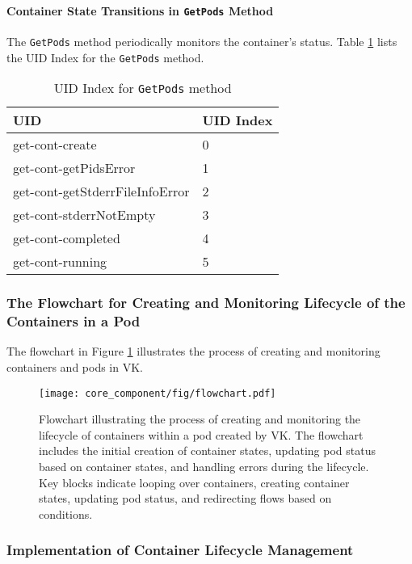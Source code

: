 \paragraph{Container State Transitions in \texttt{GetPods} Method}

The \texttt{GetPods} method periodically monitors the container's status. Table \ref{table:uid_index_getpods} lists the UID Index for the \texttt{GetPods} method.

\begin{table}[h!]
\centering
\caption{UID Index for \texttt{GetPods} method}
\label{table:uid_index_getpods}
\begin{tabular}{|l|l|}
\hline
\textbf{UID} & \textbf{UID Index} \\
\hline
get-cont-create & 0 \\
\hline
get-cont-getPidsError & 1 \\
\hline
get-cont-getStderrFileInfoError & 2 \\
\hline
get-cont-stderrNotEmpty & 3 \\
\hline
get-cont-completed & 4 \\
\hline
get-cont-running & 5 \\
\hline
\end{tabular}
\end{table}

\subsubsection{The Flowchart for Creating and Monitoring Lifecycle of the Containers in a Pod}

The flowchart in Figure \ref{fig:flowchart} illustrates the process of creating and monitoring containers and pods in VK.

\begin{figure}[htbp]
\centering
\texttt{[image: core\_component/fig/flowchart.pdf]}
\caption{Flowchart illustrating the process of creating and monitoring the lifecycle of containers within a pod created by VK. The flowchart includes the initial creation of container states, updating pod status based on container states, and handling errors during the lifecycle. Key blocks indicate looping over containers, creating container states, updating pod status, and redirecting flows based on conditions.}
\label{fig:flowchart}
\end{figure}

\subsubsection{Implementation of Container Lifecycle Management}

